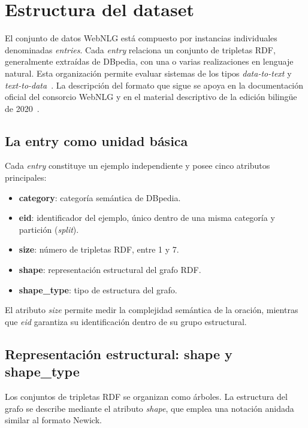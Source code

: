 \section{Estructura del dataset}

El conjunto de datos WebNLG está compuesto por instancias individuales
denominadas \textit{entries}. Cada \textit{entry} relaciona un conjunto de
tripletas RDF, generalmente extraídas de DBpedia, con una o varias
realizaciones en lenguaje natural. Esta organización permite evaluar sistemas
de los tipos \textit{data-to-text} y
\textit{text-to-data}~\cite{Gardent2017,CastroFerreira2020}. La descripción del
formato que sigue se apoya en la documentación oficial del consorcio WebNLG y
en el material descriptivo de la edición bilingüe de
2020~\cite{WebNLGGitHub,CastroFerreira2020}.

\subsection{La entry como unidad básica}

Cada \textit{entry} constituye un ejemplo independiente y posee cinco atributos
principales:

\begin{itemize}
	\item \textbf{category}: categoría semántica de DBpedia.
	\item \textbf{eid}: identificador del ejemplo, único dentro de una misma categoría y
	      partición (\textit{split}).
	\item \textbf{size}: número de tripletas RDF, entre 1 y 7.
	\item \textbf{shape}: representación estructural del grafo RDF.
	\item \textbf{shape\_type}: tipo de estructura del grafo.
\end{itemize}

El atributo \textit{size} permite medir la complejidad semántica de la oración,
mientras que \textit{eid} garantiza su identificación dentro de su grupo
estructural.

\subsection{Representación estructural: shape y shape\_type}

Los conjuntos de tripletas RDF se organizan como árboles. La estructura del
grafo se describe mediante el atributo \textit{shape}, que emplea una notación
anidada similar al formato Newick.

